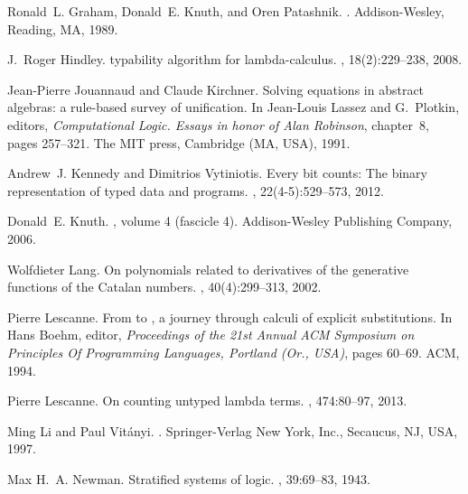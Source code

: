 \documentclass{jfp1}
\begin{document}
\begin{thebibliography}{10}
Ronald~L. Graham, Donald~E. Knuth, and Oren Patashnik.
.
\newblock Addison-Wesley, Reading, MA, 1989.

J.~Roger Hindley.
 typability algorithm for lambda-calculus.
, 18(2):229--238, 2008.

Jean-Pierre Jouannaud and Claude Kirchner.
\newblock Solving equations in abstract algebras: a rule-based survey of
  unification.
\newblock In Jean-Louis Lassez and G.~Plotkin, editors, {\em Computational
  {L}ogic. {E}ssays in honor of {A}lan {R}obinson}, chapter~8, pages 257--321.
  The MIT press, Cambridge (MA, USA), 1991.

Andrew~J. Kennedy and Dimitrios Vytiniotis.
\newblock Every bit counts: The binary representation of typed data and
  programs.
, 22(4-5):529--573, 2012.

Donald~E. Knuth.
, volume 4 (fascicle 4).
\newblock Addison-Wesley Publishing Company, 2006.

Wolfdieter Lang.
\newblock On polynomials related to derivatives of the generative functions of
  the {Catalan} numbers.
, 40(4):299--313, 2002.

Pierre Lescanne.
\newblock From  to , a journey through calculi
  of explicit substitutions.
\newblock In Hans Boehm, editor, {\em Proceedings of the 21st Annual {ACM}
  Symposium on {P}rinciples {O}f {P}rogramming {L}anguages, {Portland (Or.,
  USA)}}, pages 60--69. ACM, 1994.

Pierre Lescanne.
\newblock On counting untyped lambda terms.
, 474:80--97, 2013.

Ming Li and Paul Vit\'{a}nyi.
.
\newblock Springer-Verlag New York, Inc., Secaucus, NJ, USA, 1997.

Max H.~A. Newman.
\newblock Stratified systems of logic.
,
  39:69--83, 1943.


\end{thebibliography}
\end{document}
